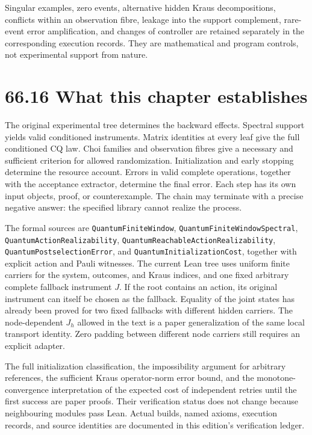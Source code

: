 \documentclass[
  11pt,
  oneside]{book}
\begin{document}
Singular examples, zero events, alternative hidden Kraus decompositions,
conflicts within an observation fibre, leakage into the support
complement, rare-event error amplification, and changes of controller
are retained separately in the corresponding execution records. They are
mathematical and program controls, not experimental support from nature.

\section{66.16 What this chapter establishes}

The original experimental tree determines the backward effects. Spectral
support yields valid conditioned instruments. Matrix identities at every
leaf give the full conditioned CQ law. Choi families and observation
fibres give a necessary and sufficient criterion for allowed
randomization. Initialization and early stopping determine the resource
account. Errors in valid complete operations, together with the
acceptance extractor, determine the final error. Each step has its own
input objects, proof, or counterexample. The chain may terminate with a
precise negative answer: the specified library cannot realize the
process.

The formal sources are \texttt{Quantum\allowbreak Finite\allowbreak Window},
\texttt{Quantum\allowbreak Finite\allowbreak Window\allowbreak Spectral},
\texttt{Quantum\allowbreak Action\allowbreak Realizability},
\texttt{Quantum\allowbreak Reachable\allowbreak Action\allowbreak Realizability},
\texttt{Quantum\allowbreak Postselection\allowbreak Error}, and
\texttt{Quantum\allowbreak Initialization\allowbreak Cost}, together with explicit action and
Pauli witnesses. The current Lean tree uses uniform finite carriers for
the system, outcomes, and Kraus indices, and one fixed arbitrary
complete fallback instrument \(J\). If the root contains an action, its
original instrument can itself be chosen as the fallback. Equality of
the joint states has already been proved for two fixed fallbacks with
different hidden carriers. The node-dependent \(J_h\) allowed in the
text is a paper generalization of the same local transport identity.
Zero padding between different node carriers still requires an explicit
adapter.

The full initialization classification, the impossibility argument for
arbitrary references, the sufficient Kraus operator-norm error bound,
and the monotone-convergence interpretation of the expected cost of
independent retries until the first success are paper proofs. Their
verification status does not change because neighbouring modules pass
Lean. Actual builds, named axioms, execution records, and source
identities are documented in this edition's verification ledger.
\end{document}
